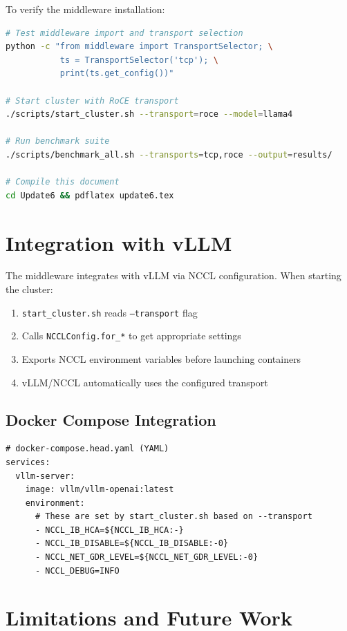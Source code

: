 \documentclass[10pt,letterpaper]{article}
\begin{document}
To verify the middleware installation:

\begin{lstlisting}[language=bash]
# Test middleware import and transport selection
python -c "from middleware import TransportSelector; \
           ts = TransportSelector('tcp'); \
           print(ts.get_config())"

# Start cluster with RoCE transport
./scripts/start_cluster.sh --transport=roce --model=llama4

# Run benchmark suite
./scripts/benchmark_all.sh --transports=tcp,roce --output=results/

# Compile this document
cd Update6 && pdflatex update6.tex
\end{lstlisting}

\section{Integration with vLLM}

The middleware integrates with vLLM via NCCL configuration. When starting the cluster:

\begin{enumerate}[noitemsep]
    \item \texttt{start\_cluster.sh} reads \texttt{--transport} flag
    \item Calls \texttt{NCCLConfig.for\_*} to get appropriate settings
    \item Exports NCCL environment variables before launching containers
    \item vLLM/NCCL automatically uses the configured transport
\end{enumerate}

\subsection{Docker Compose Integration}

\begin{lstlisting}
# docker-compose.head.yaml (YAML)
services:
  vllm-server:
    image: vllm/vllm-openai:latest
    environment:
      # These are set by start_cluster.sh based on --transport
      - NCCL_IB_HCA=${NCCL_IB_HCA:-}
      - NCCL_IB_DISABLE=${NCCL_IB_DISABLE:-0}
      - NCCL_NET_GDR_LEVEL=${NCCL_NET_GDR_LEVEL:-0}
      - NCCL_DEBUG=INFO
\end{lstlisting}

\section{Limitations and Future Work}
\end{document}
